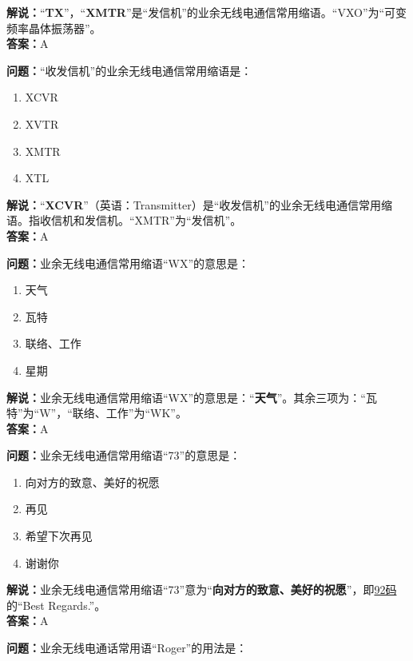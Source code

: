 \textbf{解说：}“\textbf{TX}”，“\textbf{XMTR}”是“发信机”的业余无线电通信常用缩语。“VXO”为“可变频率晶体振荡器”。\\\textbf{答案：}A



\textbf{问题：}“收发信机”的业余无线电通信常用缩语是：

\begin{enumerate}[label=\Alph*), leftmargin=1.5cm]
	\item XCVR
	\item XVTR
	\item XMTR
	\item XTL
\end{enumerate}

\textbf{解说：}“\textbf{XCVR}”（英语：Transmitter）是“收发信机”的业余无线电通信常用缩语。指收信机和发信机。“XMTR”为“发信机”。\\\textbf{答案：}A



\textbf{问题：}业余无线电通信常用缩语“WX”的意思是：

\begin{enumerate}[label=\Alph*), leftmargin=1.5cm]
	\item 天气
	\item 瓦特
	\item 联络、工作
	\item 星期
\end{enumerate}

\textbf{解说：}业余无线电通信常用缩语“WX”的意思是：“\textbf{天气}”。其余三项为：“瓦特”为“W”，“联络、工作”为“WK”。\\\textbf{答案：}A



\textbf{问题：}业余无线电通信常用缩语“73”的意思是：

\begin{enumerate}[label=\Alph*), leftmargin=1.5cm]
	\item 向对方的致意、美好的祝愿
	\item 再见
	\item 希望下次再见
	\item 谢谢你
\end{enumerate}

\textbf{解说：}业余无线电通信常用缩语“73”意为“\textbf{向对方的致意、美好的祝愿}”，即\href{https://en.wikipedia.org/wiki/Wire_signal}{92码}的“Best Regards.”。\\\textbf{答案：}A



\textbf{问题：}业余无线电通话常用语“Roger”的用法是：

